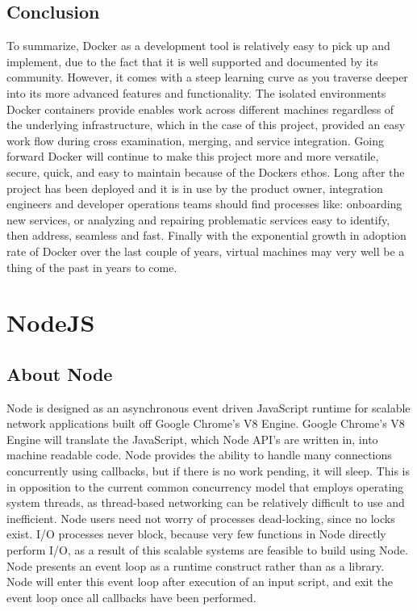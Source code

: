 \subsection{Conclusion}
	To summarize, Docker as a development tool is relatively easy to pick up and implement, due to the fact that it is well supported and documented by its community. However, it comes with a steep learning curve as you traverse deeper into its more advanced features and functionality. The isolated environments Docker containers provide enables work across different machines regardless of the underlying infrastructure, which in the case of this project, provided an easy work flow during cross examination, merging, and service integration. Going forward Docker will continue to make this project more and more versatile, secure, quick, and easy to maintain because of the Dockers ethos. Long after the project has been deployed and it is in use by the product owner, integration engineers and developer operations teams should find processes like: onboarding new services, or analyzing and repairing problematic services easy to identify, then address, seamless and fast. Finally with the exponential growth in adoption rate of Docker over the last couple of years, virtual machines may very well be a thing of the past in years to come.

\section{NodeJS}
\subsection{About Node}
	Node is designed as an asynchronous event driven JavaScript runtime for scalable network applications built off Google Chrome's V8 Engine. Google Chrome's V8 Engine will translate the JavaScript, which Node API's are written in, into machine readable code. Node provides the ability to handle many connections concurrently using callbacks, but if there is no work pending, it will sleep\cite{nodejs}. This is in opposition to the current common concurrency model that employs operating system threads, as thread-based networking can be relatively difficult to use and inefficient. Node users need not worry of processes dead-locking, since no locks exist. I/O processes never block, because very few functions in Node directly perform I/O, as a result of this scalable systems are feasible to build using Node. Node presents an event loop as a runtime construct rather than as a library. Node will enter this event loop after execution of an input script, and exit the event loop once all callbacks have been performed\cite{nodejs}.
    
